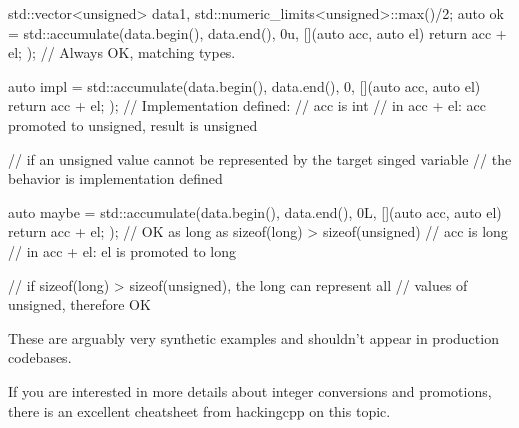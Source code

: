 \begin{box-note}
\begin{cppcode}
std::vector<unsigned> data{1, std::numeric_limits<unsigned>::max()/2};
auto ok = std::accumulate(data.begin(), data.end(), 0u, 
                          [](auto acc, auto el) { return acc + el; });
// Always OK, matching types.

auto impl = std::accumulate(data.begin(), data.end(), 0, 
                            [](auto acc, auto el) { return acc + el; });
// Implementation defined:
// acc is int
// in acc + el: acc promoted to unsigned, result is unsigned

// if an unsigned value cannot be represented by the target singed variable
// the behavior is implementation defined

auto maybe = std::accumulate(data.begin(), data.end(), 0L, 
                             [](auto acc, auto el) { return acc + el; });
// OK as long as sizeof(long) > sizeof(unsigned)
// acc is long
// in acc + el: el is promoted to long

// if sizeof(long) > sizeof(unsigned), the long can represent all 
// values of unsigned, therefore OK
\end{cppcode}
\end{box-note}

These are arguably very synthetic examples and shouldn’t appear in production codebases.

If you are interested in more details about integer conversions and promotions, there is an excellent cheatsheet from hackingcpp on this topic.